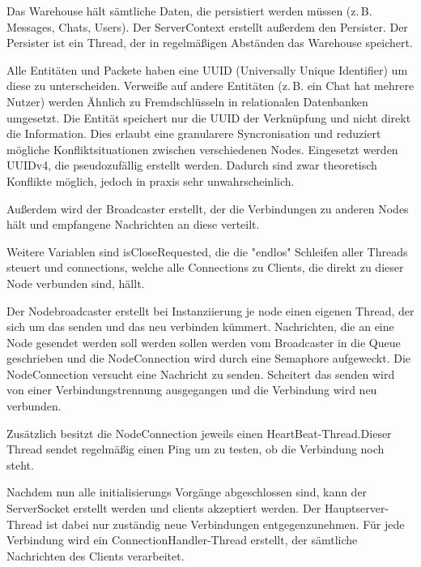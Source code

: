 Das Warehouse hält sämtliche Daten, die persistiert werden müssen (z.\,B. Messages, Chats, Users). Der ServerContext erstellt außerdem den Persister. Der Persister ist ein Thread, der in regelmäßigen Abständen das Warehouse speichert.


Alle Entitäten und Packete haben eine UUID (Universally Unique Identifier) um diese zu unterscheiden. Verweiße auf andere Entitäten (z.\,B. ein Chat hat mehrere Nutzer) werden Ähnlich zu Fremdschlüsseln in relationalen Datenbanken umgesetzt. Die Entität speichert nur die UUID der Verknüpfung und nicht direkt die Information. Dies erlaubt eine granularere Syncronisation und reduziert mögliche Konfliktsituationen zwischen verschiedenen Nodes. Eingesetzt werden UUIDv4, die pseudozufällig erstellt werden. Dadurch sind zwar theoretisch Konflikte möglich, jedoch in praxis sehr unwahrscheinlich.

Außerdem wird der Broadcaster erstellt, der die Verbindungen zu anderen Nodes hält und empfangene Nachrichten an diese verteilt.




Weitere Variablen sind isCloseRequested, die die "endlos" Schleifen aller Threads steuert und connections, welche alle Connections zu Clients, die direkt zu dieser Node verbunden sind, hällt.

Der Nodebroadcaster erstellt bei Instanziierung je node einen eigenen Thread, der sich um das senden und das neu verbinden kümmert.
Nachrichten, die an eine Node gesendet werden soll werden sollen werden vom Broadcaster in die Queue geschrieben und die NodeConnection wird durch eine Semaphore aufgeweckt. 
Die NodeConnection versucht eine Nachricht zu senden. Scheitert das senden wird von einer Verbindungstrennung ausgegangen und die Verbindung wird neu verbunden.

Zusätzlich besitzt die NodeConnection jeweils einen HeartBeat-Thread.Dieser Thread sendet regelmäßig einen Ping um zu testen, ob die Verbindung noch steht.


Nachdem nun alle initialisierungs Vorgänge abgeschlossen sind, kann der ServerSocket erstellt werden und clients akzeptiert werden.
Der Hauptserver-Thread ist dabei nur zuständig neue Verbindungen entgegenzunehmen. Für jede Verbindung wird ein ConnectionHandler-Thread erstellt, der sämtliche Nachrichten des Clients verarbeitet.


